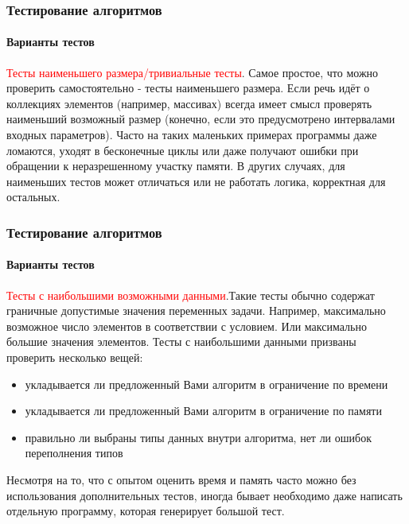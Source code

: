\documentclass[aspectratio=169]{beamer}
\begin{document}
\begin{frame}
\frametitle{Тестирование алгоритмов}
\framesubtitle{Варианты тестов}
\justifying
\textcolor{red}{Тесты наименьшего размера/тривиальные тесты}. \newline Самое простое, что можно проверить самостоятельно - тесты наименьшего размера. Если речь идёт о коллекциях элементов (например, массивах) всегда имеет смысл проверять наименьший возможный размер (конечно, если это предусмотрено интервалами входных параметров). \newline\newline Часто на таких маленьких примерах программы даже ломаются, уходят в бесконечные циклы или даже получают ошибки при обращении к неразрешенному участку памяти. \newline\newline В других случаях, для наименьших тестов может отличаться или не работать логика, корректная для остальных.
\end{frame}


\begin{frame}
\frametitle{Тестирование алгоритмов}
\framesubtitle{Варианты тестов}
\justifying
\textcolor{red}{Тесты с наибольшими возможными данными}.\newline Такие тесты обычно содержат граничные допустимые значения переменных задачи. Например, максимально возможное число элементов в соответствии с условием. Или максимально большие значения элементов.\newline\newline
Тесты с наибольшими данными призваны проверить несколько вещей:

\begin{itemize}
\item{укладывается ли предложенный Вами алгоритм в ограничение по времени}
\item{укладывается ли предложенный Вами алгоритм в ограничение по памяти}
\item{правильно ли выбраны типы данных внутри алгоритма, нет ли ошибок переполнения типов}
\end{itemize}

Несмотря на то, что с опытом оценить время и память часто можно без использования дополнительных тестов, иногда бывает необходимо даже написать отдельную программу, которая генерирует большой тест.
\end{frame}
\end{document}
